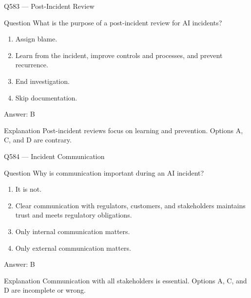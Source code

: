 \documentclass[aspectratio=169,8pt]{beamer}
\begin{document}
	\begin{frame}{Q583 --- Post-Incident Review}
		\begin{block}{Question}
			What is the purpose of a post-incident review for AI incidents?
			\begin{enumerate}
				\item Assign blame.
				\item Learn from the incident, improve controls and processes, and prevent recurrence.
				\item End investigation.
				\item Skip documentation.
			\end{enumerate}
		\end{block}
		\begin{exampleblock}{Answer: B}\end{exampleblock}
		\begin{block}{Explanation}
			Post-incident reviews focus on learning and prevention. Options A, C, and D are contrary.
		\end{block}
	\end{frame}
	
	\begin{frame}{Q584 --- Incident Communication}
		\begin{block}{Question}
			Why is communication important during an AI incident?
			\begin{enumerate}
				\item It is not.
				\item Clear communication with regulators, customers, and stakeholders maintains trust and meets regulatory obligations.
				\item Only internal communication matters.
				\item Only external communication matters.
			\end{enumerate}
		\end{block}
		\begin{exampleblock}{Answer: B}\end{exampleblock}
		\begin{block}{Explanation}
			Communication with all stakeholders is essential. Options A, C, and D are incomplete or wrong.
		\end{block}
	\end{frame}
	
\end{document}
